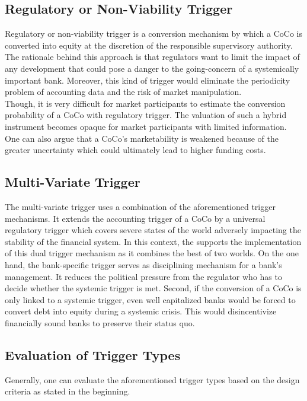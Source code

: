 \subsection{Regulatory or Non-Viability Trigger} \label{regulatorytrigger}

Regulatory or non-viability trigger is a conversion mechanism by which a CoCo is converted into equity at the discretion of the responsible supervisory authority. The rationale behind this approach is that regulators want to limit the impact of any development that could pose a danger to the going-concern of a systemically important bank.\citet{erismann2015pricing} Moreover, this kind of trigger would eliminate the periodicity problem of accounting data and the risk of market manipulation.\\ 

Though, it is very difficult for market participants to estimate the conversion probability of a CoCo with regulatory trigger. The valuation of such a hybrid instrument becomes opaque for market participants with limited information. \citep{alvemar2012modelling} One can also argue that a CoCo's marketability is weakened because of the greater uncertainty which could ultimately lead to higher funding costs. \citep{de2014handbook} 

\subsection{Multi-Variate Trigger} \label{multivariatetrigger}

The multi-variate trigger uses a combination of the aforementioned trigger mechanisms. It extends the accounting trigger of a CoCo by a universal regulatory trigger which covers severe states of the world adversely impacting the stability of the financial system. In this context, the \citet{squam2009expedited} supports the implementation of this dual trigger mechanism as it combines the best of two worlds. On the one hand, the bank-specific trigger serves as disciplining mechanism for a bank's management. It reduces the political pressure from the regulator who has to decide whether the systemic trigger is met. Second, if the conversion of a CoCo is only linked to a systemic trigger, even well capitalized banks would be forced to convert debt into equity during a systemic crisis. This would disincentivize financially sound banks to preserve their status quo.

\subsection{Evaluation of Trigger Types}
Generally, one can evaluate the aforementioned trigger types based on the design criteria as stated in the beginning.

